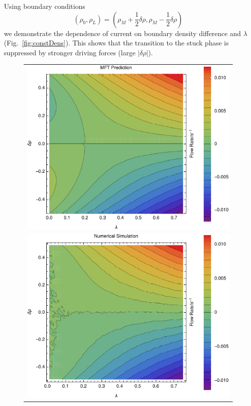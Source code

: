 \documentclass[
reprint, amsmath,amssymb,
]{revtex4-1}
\begin{document}
Using boundary conditions
\begin{equation}
(\rho_0,\rho_L)=(\rho_M+\frac{1}{2}\delta\rho, \rho_M-\frac{1}{2}\delta\rho) 
\end{equation}
we demonstrate the
dependence of current on boundary density difference and $\lambda$ (Fig.~\ref{fig:constDens}).  This
shows that the transition to the stuck phase is suppressed by stronger
driving forces (large $|\delta\rho|$).
\begin{figure}[h!]
\vspace{0em}
\begin{center}
 \begin{tabular}{c}
    \includegraphics[width=1\linewidth]{newMftPred} \\
    \includegraphics[width=1\linewidth]{newFlow}

\end{tabular}
\end{center}
\end{figure}
\end{document}
